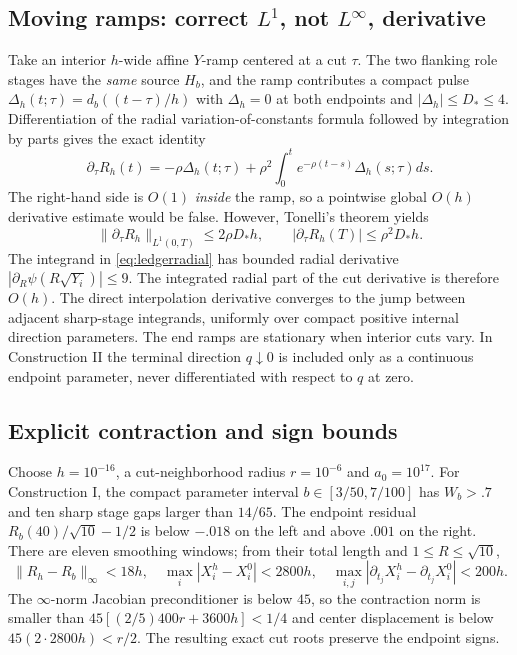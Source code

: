 \documentclass[review,hidelinks,onefignum,onetabnum]{siamonline250211}%
\begin{document}
\subsection{Moving ramps: correct $L^1$, not $L^\infty$, derivative}
Take an interior $h$-wide affine $Y$-ramp centered at a cut $\tau$.
The two flanking role stages have the \emph{same} source $H_b$,
and the ramp contributes a compact pulse
$\Delta_h(t;\tau)=d_b((t-\tau)/h)$ with
$\Delta_h=0$ at both endpoints and
$|\Delta_h|\le D_*\le4$. Differentiation of the radial
variation-of-constants formula followed by integration by parts
gives the exact identity
\begin{equation}\label{eq:movingderivative}
 \partial_\tau R_h(t)=-\rho\Delta_h(t;\tau)
 +\rho^2\int_0^t e^{-\rho(t-s)}\Delta_h(s;\tau)ds.
\end{equation}
The right-hand side is $O(1)$ \emph{inside} the ramp, so a
pointwise global $O(h)$ derivative estimate would be false.
However, Tonelli's theorem yields
\begin{equation}\label{eq:movingsensitivity}
 \|\partial_\tau R_h\|_{L^1(0,T)}\le2\rho D_*h,
 \qquad |\partial_\tau R_h(T)|\le\rho^2D_*h.
\end{equation}
The integrand in \eqref{eq:ledgerradial} has bounded radial
derivative $|\partial_R\psi(R\sqrt{Y_i})|\le9$.
The integrated radial part of the cut derivative is therefore
$O(h)$. The direct interpolation derivative converges to the
jump between adjacent sharp-stage integrands, uniformly over
compact positive internal direction parameters. The end ramps
are stationary when interior cuts vary. In Construction II the
terminal direction $q\downarrow0$ is included only as a
continuous endpoint parameter, never differentiated with
respect to $q$ at zero.

\subsection{Explicit contraction and sign bounds}
Choose $h=10^{-16}$, a cut-neighborhood radius $r=10^{-6}$ and
$a_0=10^{17}$. For Construction I, the compact parameter interval
$b\in[3/50,7/100]$ has $W_b>.7$ and ten sharp stage gaps
larger than $14/65$. The endpoint residual
$R_b(40)/\sqrt{10}-1/2$ is below $-.018$ on the left and
above $.001$ on the right. There are eleven smoothing windows;
from their total length and $1\le R\le\sqrt{10}$,
\[
 \|R_h-R_b\|_\infty<18h,\quad
 \max_i|X_i^h-X_i^0|<2800h,\quad
 \max_{i,j}|\partial_{t_j}X_i^h-
                    \partial_{t_j}X_i^0|<200h.
\]
The $\infty$-norm Jacobian preconditioner is below $45$,
so the contraction norm is smaller than
$45[(2/5)400r+3600h]<1/4$ and center displacement is
below $45(2\cdot2800h)<r/2$.
The resulting exact cut roots preserve the endpoint signs.
\end{document}
